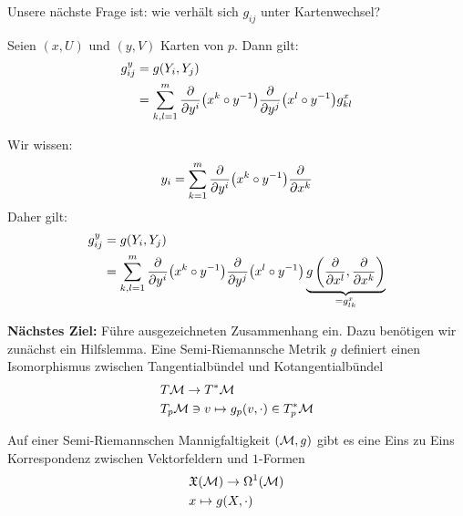 Unsere nächste Frage ist: wie verhält sich $g_{ij}$ unter Kartenwechsel?
\begin{lem}[Transformationsregel]
\label{lem:Transformationsregel}
Seien $(x, U)$ und $(y, V)$ Karten von $p$.
Dann gilt:
\begin{align*}
g^{y}_{ij} &= g(Y_i, Y_j)\\
&= \sum^m_{k,l = 1} \pdv{y^i}(x^k \circ y^{-1}) \pdv{y^j} (x^l \circ y^{-1}) g^x_{kl}
\end{align*}
\end{lem}
\begin{bew}
Wir wissen:
\begin{align*}
y_i = \sum^m_{k=1} \pdv{y^i} (x^k \circ y^{-1}) \pdv{x^k}
\end{align*}
Daher gilt:
\begin{align*}
g^y_{ij} &= g(Y_i, Y_j)\\
&= \sum^m_{k,l = 1} \pdv{y^i}(x^k \circ y^{-1}) \pdv{y^j} (x^l \circ y^{-1}) \underbrace{g\left( \pdv{x^l}, \pdv{x^k} \right)}_{= g^x_{lk}}
\end{align*}
\end{bew}

\textbf{Nächstes Ziel:} Führe ausgezeichneten Zusammenhang ein.
Dazu benötigen wir zunächst ein Hilfslemma.
Eine Semi-Riemannsche Metrik $g$ definiert einen Isomorphismus zwischen Tangentialbündel und Kotangentialbündel
\begin{align}
&T \mathcal{M} \to T^\ast \mathcal{M}\\
&T_p \mathcal{M} \ni v \mapsto g_p (v, \cdot) \in T^\ast_p \mathcal{M}
\end{align}

\begin{hlem}
\label{hlem:formvfkorrespondenz}
Auf einer Semi-Riemannschen Mannigfaltigkeit $(\mathcal{M}, g)$ gibt es eine Eins zu Eins Korrespondenz zwischen Vektorfeldern und $1$-Formen
\begin{align}
&\mathfrak{X}(\mathcal{M}) \to \Omega^1 (\mathcal{M})\\
& x \mapsto g(X, \cdot)
\end{align}
\end{hlem}


